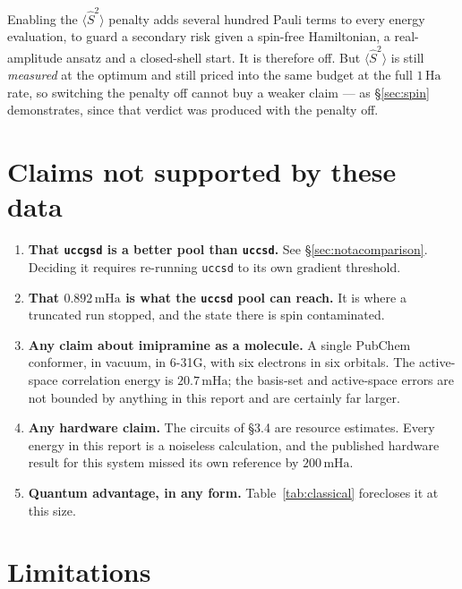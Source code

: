 \documentclass[11pt,a4paper]{article}
\newcommand{\mHa}{\ensuremath{\,\mathrm{mHa}}}
\newcommand{\Ha}{\ensuremath{\,\mathrm{Ha}}}
\newcommand{\Ssq}{\ensuremath{\langle \hat{S}^2 \rangle}}
\newcommand{\code}[1]{\texttt{\small #1}}
\begin{document}
Enabling the $\Ssq$ penalty adds several hundred Pauli terms to every energy
evaluation, to guard a secondary risk given a spin-free Hamiltonian, a
real-amplitude ansatz and a closed-shell start. It is therefore off. But $\Ssq$
is still \emph{measured} at the optimum and still priced into the same budget at
the full $1\Ha$ rate, so switching the penalty off cannot buy a weaker claim ---
as \S\ref{sec:spin} demonstrates, since that verdict was produced with the
penalty off.

\section{Claims not supported by these data}

\begin{enumerate}[leftmargin=1.4em,itemsep=0.3em]

\item \textbf{That \code{uccgsd} is a better pool than \code{uccsd}.} See
  \S\ref{sec:notacomparison}. Deciding it requires re-running \code{uccsd} to
  its own gradient threshold.

\item \textbf{That $0.892\mHa$ is what the \code{uccsd} pool can reach.} It is
  where a truncated run stopped, and the state there is spin contaminated.

\item \textbf{Any claim about imipramine as a molecule.} A single PubChem
  conformer, in vacuum, in 6-31G, with six electrons in six orbitals. The
  active-space correlation energy is $20.7\mHa$; the basis-set and
  active-space errors are not bounded by anything in this report and are
  certainly far larger.

\item \textbf{Any hardware claim.} The circuits of \S3.4 are resource estimates.
  Every energy in this report is a noiseless calculation, and the published
  hardware result for this system missed its own reference by $200\mHa$.

\item \textbf{Quantum advantage, in any form.} Table~\ref{tab:classical}
  forecloses it at this size.

\end{enumerate}

\section{Limitations}
\end{document}

